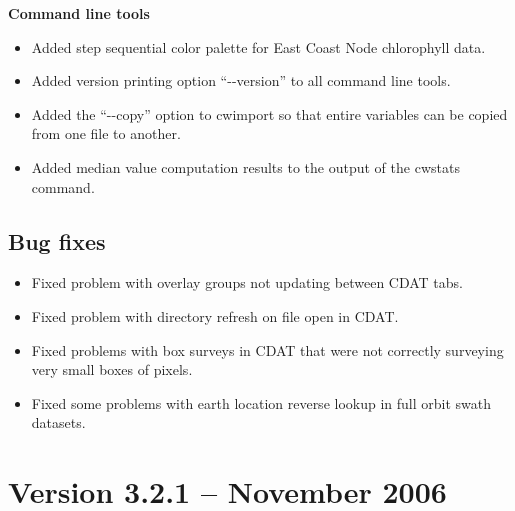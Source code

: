 \hspace{0.4cm} {\bf Command line tools}

\begin{itemize}

  \item Added step sequential color palette for East Coast Node
  chlorophyll data.

  \item Added version printing option ``-{-}version'' to all command
  line tools.

  \item Added the ``-{-}copy'' option to cwimport so that entire
  variables can be copied from one file to another.

  \item Added median value computation results to the output of the
  cwstats command.

\end{itemize}

\subsection*{ Bug fixes}
\begin{itemize}

  \item Fixed problem with overlay groups not updating between CDAT
  tabs.

  \item Fixed problem with directory refresh on file open in CDAT.

  \item Fixed problems with box surveys in CDAT that were not
  correctly surveying very small boxes of pixels.

  \item Fixed some problems with earth location reverse lookup in full
  orbit swath datasets.

\end{itemize}


\section{Version 3.2.1 -- November 2006}

